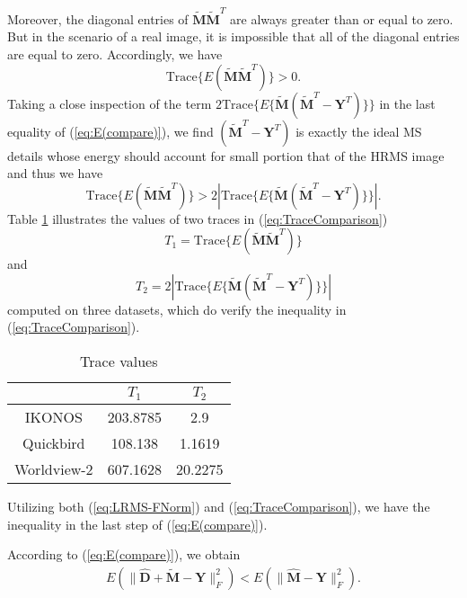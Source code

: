 \documentclass[journal]{IEEEtran}
\begin{document}
Moreover,
the diagonal entries of $\widetilde {\mathbf{M}}\widetilde {\mathbf{M}}^T$ are always greater than or equal to zero. But in the scenario of a real image, it is impossible that all of the diagonal entries are equal to zero. Accordingly, we have
\begin{equation}
\label{eq:LRMS-FNorm}
\mathrm{Trace}\{E(\widetilde {\mathbf{M}}\widetilde {\mathbf{M}}^T)\}>0.
\end{equation}
Taking a close inspection of the term $2\mathrm{Trace}\{E\{\widetilde {\mathbf{M}}(\widetilde{\mathbf{M}}^T-\mathbf{Y}^T)\}\}$ in the last equality of (\ref{eq:E(compare)}), we find $(\widetilde{\mathbf{M}}^T-\mathbf{Y}^T)$ is exactly the ideal MS details whose energy should account for small portion that of the HRMS image and thus we have
\begin{equation}
\mathrm{Trace}\{E(\widetilde {\mathbf{M}}\widetilde {\mathbf{M}}^T)\}>2|\mathrm{Trace}\{E\{\widetilde {\mathbf{M}}(\widetilde{\mathbf{M}}^T-\mathbf{Y}^T)\}\}|.
\label{eq:TraceComparison}
\end{equation}
Table \ref{table:TraceComparison} illustrates the values of two traces in  (\ref{eq:TraceComparison})
\[T_1=\mathrm{Trace}\{E(\widetilde {\mathbf{M}}\widetilde {\mathbf{M}}^T)\}\]
and
\[T_2=2|\mathrm{Trace}\{E\{\widetilde {\mathbf{M}}(\widetilde{\mathbf{M}}^T-\mathbf{Y}^T)\}\}|\]
computed on three datasets, which do verify the inequality in (\ref{eq:TraceComparison}).
\begin{table}[H]
\caption{Trace values}
\centering
\begin{tabular}{c|cc}
\hline
{}& $T_1$  & $T_2$ \\
\hline
IKONOS& 203.8785 &2.9\\
\hline
Quickbird& 108.138 &1.1619\\
\hline
Worldview-2 &607.1628 &20.2275\\
\hline
\end{tabular}
\label{table:TraceComparison}
\end{table}
Utilizing both (\ref{eq:LRMS-FNorm}) and (\ref{eq:TraceComparison}), we have the inequality in the last step of (\ref{eq:E(compare)}).

According to (\ref{eq:E(compare)}), we obtain
\begin{equation}
\label{eq:E(conclude)}
\begin{split}
E(\|\widehat{\mathbf{D}} + \widetilde {\mathbf{M}} - {\mathbf{Y}}\|^2_F) < E(\|\widehat {\mathbf {M}} - {\mathbf{Y}}\|^2_F).
\end{split}
\end{equation}
\end{document}
